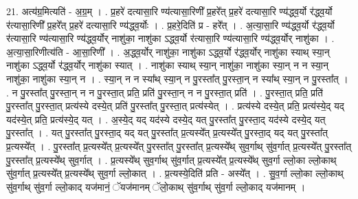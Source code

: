 \documentclass[17pt]{extarticle}
\begin{document}
21. अत्य॑ग्र॒मित्यति॑ - अ॒ग्र॒म् । . प्र॒हरे॑ दत्यासा॒रि ण्य॑त्यासा॒रिणी᳚ प्र॒हरे᳚त् प्र॒हरे॑ दत्यासा॒रि ण्य॑द्ध्व॒र्यो र॑द्ध्व॒र्यो र॑त्यासा॒रिणी᳚ प्र॒हरे᳚त् प्र॒हरे॑ दत्यासा॒रि ण्य॑द्ध्व॒र्योः । . प्र॒हरे॒दिति॑ प्र - हरे᳚त् । . अ॒त्या॒सा॒रि ण्य॑द्ध्व॒र्यो र॑द्ध्व॒र्यो र॑त्यासा॒रि ण्य॑त्यासा॒रि ण्य॑द्ध्व॒र्योर् नाशु॑का॒ नाशु॑का ऽद्ध्व॒र्यो र॑त्यासा॒रि ण्य॑त्यासा॒रि ण्य॑द्ध्व॒र्योर् नाशु॑का । . अ॒त्या॒सा॒रिणीत्य॑ति - आ॒सा॒रिणी᳚ । . अ॒द्ध्व॒र्योर् नाशु॑का॒ नाशु॑का ऽद्ध्व॒र्यो र॑द्ध्व॒र्योर् नाशु॑का स्याथ् स्या॒न् नाशु॑का ऽद्ध्व॒र्यो र॑द्ध्व॒र्योर् नाशु॑का स्यात् । . नाशु॑का स्याथ् स्या॒न् नाशु॑का॒ नाशु॑का स्या॒न् न न स्या॒न् नाशु॑का॒ नाशु॑का स्या॒न् न । . स्या॒न् न न स्या᳚थ् स्या॒न् न पु॒रस्ता᳚त् पु॒रस्ता॒न् न स्या᳚थ् स्या॒न् न पु॒रस्ता᳚त् । . न पु॒रस्ता᳚त् पु॒रस्ता॒न् न न पु॒रस्ता॒त् प्रति॒ प्रति॑ पु॒रस्ता॒न् न न पु॒रस्ता॒त् प्रति॑ । . पु॒रस्ता॒त् प्रति॒ प्रति॑ पु॒रस्ता᳚त् पु॒रस्ता॒त् प्रत्य॑स्ये दस्ये॒त् प्रति॑ पु॒रस्ता᳚त् पु॒रस्ता॒त् प्रत्य॑स्येत् । . प्रत्य॑स्ये दस्ये॒त् प्रति॒ प्रत्य॑स्ये॒द् यद् यद॑स्ये॒त् प्रति॒ प्रत्य॑स्ये॒द् यत् । . अ॒स्ये॒द् यद् यद॑स्ये दस्ये॒द् यत् पु॒रस्ता᳚त् पु॒रस्ता॒द् यद॑स्ये दस्ये॒द् यत् पु॒रस्ता᳚त् । . यत् पु॒रस्ता᳚त् पु॒रस्ता॒द् यद् यत् पु॒रस्ता᳚त् प्र॒त्यस्ये᳚त् प्र॒त्यस्ये᳚त् पु॒रस्ता॒द् यद् यत् पु॒रस्ता᳚त् प्र॒त्यस्ये᳚त् । . पु॒रस्ता᳚त् प्र॒त्यस्ये᳚त् प्र॒त्यस्ये᳚त् पु॒रस्ता᳚त् पु॒रस्ता᳚त् प्र॒त्यस्ये᳚थ् सुव॒र्गाथ् सु॑व॒र्गात् प्र॒त्यस्ये᳚त् पु॒रस्ता᳚त् पु॒रस्ता᳚त् प्र॒त्यस्ये᳚थ् सुव॒र्गात् । . प्र॒त्यस्ये᳚थ् सुव॒र्गाथ् सु॑व॒र्गात् प्र॒त्यस्ये᳚त् प्र॒त्यस्ये᳚थ् सुव॒र्गा ल्लो॒का ल्लो॒काथ् सु॑व॒र्गात् प्र॒त्यस्ये᳚त् प्र॒त्यस्ये᳚थ् सुव॒र्गा ल्लो॒कात् । . प्र॒त्यस्ये॒दिति॑ प्रति - अस्ये᳚त् । . सु॒व॒र्गा ल्लो॒का ल्लो॒काथ् सु॑व॒र्गाथ् सु॑व॒र्गा ल्लो॒काद् यज॑मानं॒ ॅयज॑मानम् ॅलो॒काथ् सु॑व॒र्गाथ् सु॑व॒र्गा ल्लो॒काद् यज॑मानम् । \newline
\end{document}
